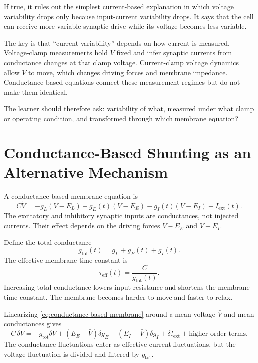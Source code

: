 If true, it rules out the simplest current-based explanation in which voltage variability drops only because input-current variability drops. It says that the cell can receive more variable synaptic drive while its voltage becomes less variable.

The key is that ``current variability'' depends on how current is measured. Voltage-clamp measurements hold $V$ fixed and infer synaptic currents from conductance changes at that clamp voltage. Current-clamp voltage dynamics allow $V$ to move, which changes driving forces and membrane impedance. Conductance-based equations connect these measurement regimes but do not make them identical.

The learner should therefore ask: variability of what, measured under what clamp or operating condition, and transformed through which membrane equation?

\section{Conductance-Based Shunting as an Alternative Mechanism}
\label{sec:conductance-based-shunting-alternative}

A conductance-based membrane equation is
%
\begin{equation}
  C\dot V
  =
  -g_L(V-E_L)
  -
  g_E(t)(V-E_E)
  -
  g_I(t)(V-E_I)
  +
  I_{\mathrm{ext}}(t).
  \label{eq:conductance-based-membrane}
\end{equation}
%
The excitatory and inhibitory synaptic inputs are conductances, not injected currents. Their effect depends on the driving forces $V-E_E$ and $V-E_I$.

Define the total conductance
%
\begin{equation}
  g_{\mathrm{tot}}(t)
  =
  g_L+g_E(t)+g_I(t).
  \label{eq:total-conductance}
\end{equation}
%
The effective membrane time constant is
%
\begin{equation}
  \tau_{\mathrm{eff}}(t)
  =
  \frac{C}{g_{\mathrm{tot}}(t)}.
  \label{eq:effective-time-constant}
\end{equation}
%
Increasing total conductance lowers input resistance and shortens the membrane time constant. The membrane becomes harder to move and faster to relax.

Linearizing \eqref{eq:conductance-based-membrane} around a mean voltage $\bar V$ and mean conductances gives
%
\begin{equation}
  C\,\delta\dot V
  =
  -\bar g_{\mathrm{tot}}\delta V
  +
  (E_E-\bar V)\delta g_E
  +
  (E_I-\bar V)\delta g_I
  +
  \delta I_{\mathrm{ext}}
  +
  \text{higher-order terms}.
  \label{eq:conductance-linearization}
\end{equation}
%
The conductance fluctuations enter as effective current fluctuations, but the voltage fluctuation is divided and filtered by $\bar g_{\mathrm{tot}}$.

